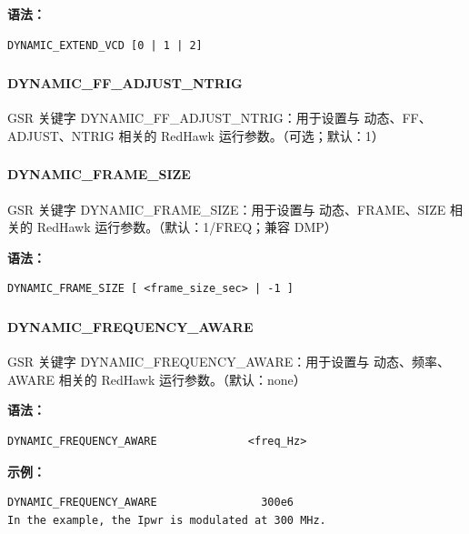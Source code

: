 \textbf{语法：}
\begin{lstlisting}
DYNAMIC_EXTEND_VCD [0 | 1 | 2]
\end{lstlisting}

\subsubsection{}
\paragraph*{DYNAMIC_FF_ADJUST_NTRIG}

GSR 关键字 DYNAMIC_FF_ADJUST_NTRIG：用于设置与 动态、FF、ADJUST、NTRIG 相关的 RedHawk 运行参数。（可选；默认：1）

\subsubsection{}
\paragraph*{DYNAMIC_FRAME_SIZE}

GSR 关键字 DYNAMIC_FRAME_SIZE：用于设置与 动态、FRAME、SIZE 相关的 RedHawk 运行参数。（默认：1/FREQ；兼容 DMP）

\textbf{语法：}
\begin{lstlisting}
DYNAMIC_FRAME_SIZE [ <frame_size_sec> | -1 ]
\end{lstlisting}

\subsubsection{}
\paragraph*{DYNAMIC_FREQUENCY_AWARE}

GSR 关键字 DYNAMIC_FREQUENCY_AWARE：用于设置与 动态、频率、AWARE 相关的 RedHawk 运行参数。（默认：none）

\textbf{语法：}
\begin{lstlisting}
DYNAMIC_FREQUENCY_AWARE              <freq_Hz>
\end{lstlisting}

\textbf{示例：}
\begin{lstlisting}
DYNAMIC_FREQUENCY_AWARE                300e6
In the example, the Ipwr is modulated at 300 MHz.
\end{lstlisting}

